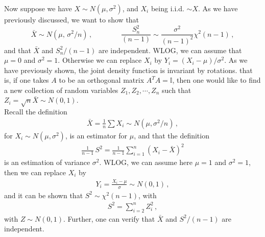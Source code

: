 \documentclass[11pt, onesided]{book}
\theoremstyle{break}
\theoremstyle{break}
\begin{document}
Now suppose we have $X \sim N(\mu, \sigma^2)$, and $X_i$ being i.i.d. $\sim X$. As we have previously discussed, we want to show that 
$$\bar{X} \sim N(\mu,\, \sigma^2/n)\,, \qquad\qquad \frac{S_n^2}{(n-1)} \sim \frac{\sigma^2}{(n-1)^2}\chi^2(n-1)\,,$$
and that $\bar{X}$ and $S^2_n/(n-1)$ are independent. WLOG, we can assume that $\mu = 0$ and $\sigma^2 = 1$. Otherwise we can replace $X_i$ by $Y_i = (X_i - \mu)/\sigma^2$. As we have previously shown, the joint density function is invariant by rotations. that is, if one takes $A$ to be an orthogonal matrix $A^TA = \mathbb{I}$, then one would like to find a new collection of random variables $Z_1,Z_2,\cdots, Z_n$ such that $Z_i = \sqrt{n}\bar{X} \sim N(0,1)$. \\


\newpage
Recall the definition
\begin{align*}
\bar{X} = \frac{1}{n}\sum X_i \sim N(\mu,\sigma^2/n)\,,
\end{align*}
for $X_i \sim N(\mu, \sigma^2)$, is an estimator for $\mu$, and that the definition
\begin{align*}
\frac{1}{n-1} \, S^2 = \frac{1}{n-1} \sum_{i=1}^n (X_i - \bar{X})^2
\end{align*}
is an estimation of variance $\sigma^2$. WLOG, we can assume here $\mu = 1$ and $\sigma^2 = 1$, then we can replace $X_i$ by 
\begin{align*}
Y_i = \frac{X_i - \mu}{\sigma} \sim N(0,1)\,,
\end{align*}
and it can be shown that $S^2 \sim \chi^2(n-1)$, with
\begin{align*}
S^2 = \sum_{i=2}^n Z_i^2 \,,
\end{align*}
with $Z \sim N(0,1)$. Further, one can verify that $\bar{X}$ and $S^2/(n-1)$ are independent. \\
\end{document}
